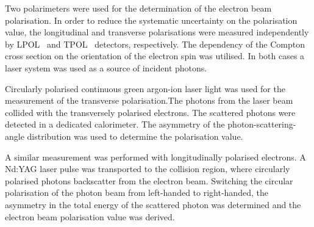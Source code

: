 Two polarimeters were used for the determination of the electron beam polarisation. In order to reduce the systematic uncertainty on the polarisation value, the longitudinal and transverse polarisations were measured independently by LPOL~\cite{nim:a479:334} and TPOL~\cite{nim:a329:79} detectors, respectively. The dependency of the Compton cross section on the orientation of the electron spin was utilised. In both cases a laser system was used as a source of incident photons.

Circularly polarised continuous green argon-ion laser light was used for the measurement of the transverse polarisation.The photons from the laser beam collided with the transversely polarised electrons. The scattered photons were detected in a dedicated calorimeter. The asymmetry of the photon-scattering-angle distribution was used to determine the polarisation value.

A similar measurement was performed with longitudinally polarised electrons. A Nd:YAG laser pulse was transported to the collision region, where circularly polarised photons backscatter from the electron beam. Switching the circular polarisation of the photon beam from left-handed to right-handed, the asymmetry in the total energy of the scattered photon was determined and the electron beam polarisation value was derived.
